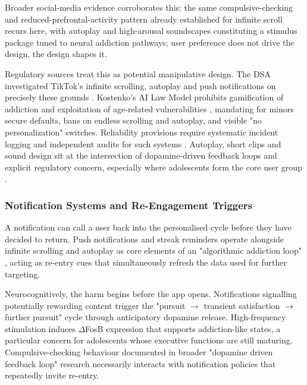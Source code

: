 \documentclass[11pt]{article}
\begin{document}
Broader social-media evidence corroborates this: the same compulsive-checking and reduced-prefrontal-activity pattern already established for infinite scroll \parencites[2]{3303310} recurs here, with autoplay and high-arousal soundscapes constituting a stimulus package tuned to neural addiction pathways; user preference does not drive the design, the design shapes it.

Regulatory sources treat this as potential manipulative design. The DSA investigated TikTok's infinite scrolling, autoplay and push notifications on precisely these grounds \parencites[2]{8958037}. Kostenko's AI Law Model prohibits gamification of addiction and exploitation of age-related vulnerabilities \parencites[223]{2977039}, mandating for minors secure defaults, bans on endless scrolling and autoplay, and visible "no personalization" switches. Reliability provisions require systematic incident logging and independent audits for such systems \parencites[57]{2977039}[79]{2977039}. Autoplay, short clips and sound design sit at the intersection of dopamine-driven feedback loops and explicit regulatory concern, especially where adolescents form the core user group \parencites[2]{8958037}[3]{8958037}[2]{3303310}[223]{2977039}.

\subsubsection{Notification Systems and Re-Engagement Triggers}
\label{sec:notification_reengagement_triggers} A notification can call a user back into the personalised cycle before they have decided to return. Push notifications and streak reminders operate alongside infinite scrolling and autoplay as core elements of an "algorithmic addiction loop" \parencites[2]{8958037}[3]{8958037}, acting as re-entry cues that simultaneously refresh the data used for further targeting.

Neurocognitively, the harm begins before the app opens. Notifications signalling potentially rewarding content trigger the "pursuit $\rightarrow$ transient satisfaction $\rightarrow$ further pursuit" cycle through anticipatory dopamine release. High-frequency stimulation induces $\Delta$FosB expression \parencites[3]{8958037}[2]{8958037} that supports addiction-like states, a particular concern for adolescents whose executive functions are still maturing. Compulsive-checking behaviour documented in broader "dopamine driven feedback loop" research \parencites[2]{3303310} necessarily interacts with notification policies that repeatedly invite re-entry.
\end{document}
